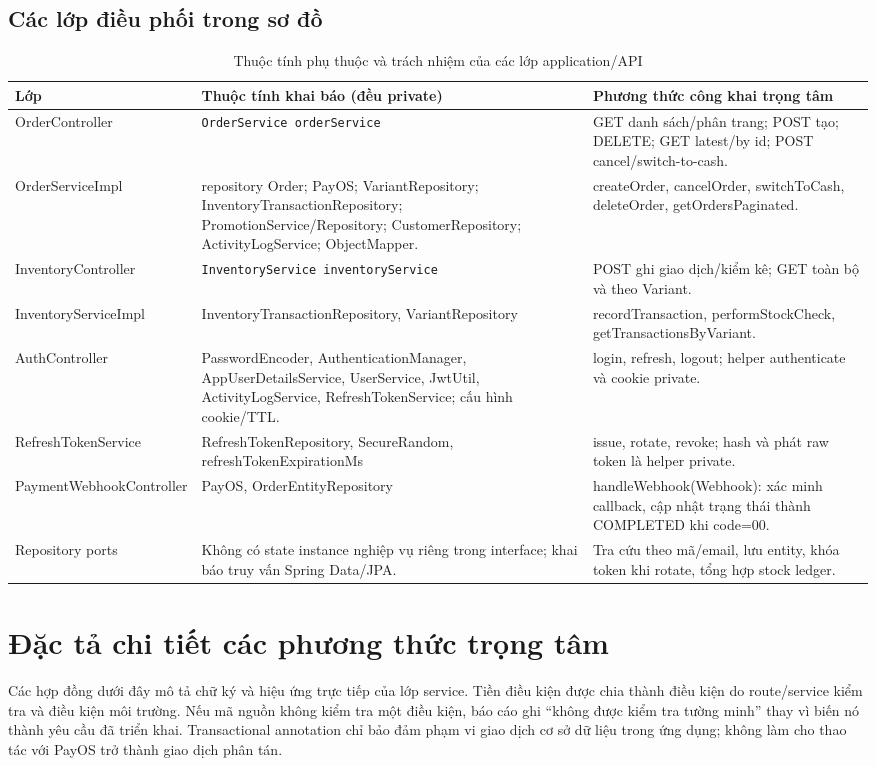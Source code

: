\documentclass[12pt,a4paper,oneside]{report}
\begin{document}
\subsection{Các lớp điều phối trong sơ đồ}
\begin{table}[htbp]
\centering\small
\caption{Thuộc tính phụ thuộc và trách nhiệm của các lớp application/API}
\begin{tabularx}{\textwidth}{@{}p{3.3cm}p{5.8cm}Y@{}}\toprule
Lớp & Thuộc tính khai báo (đều private) & Phương thức công khai trọng tâm\\\midrule
OrderController & \texttt{OrderService orderService} & GET danh sách/phân trang; POST tạo; DELETE; GET latest/by id; POST cancel/switch-to-cash.\\
OrderServiceImpl & repository Order; PayOS; VariantRepository; InventoryTransactionRepository; PromotionService/Repository; CustomerRepository; ActivityLogService; ObjectMapper. & createOrder, cancelOrder, switchToCash, deleteOrder, getOrdersPaginated.\\
InventoryController & \texttt{InventoryService inventoryService} & POST ghi giao dịch/kiểm kê; GET toàn bộ và theo Variant.\\
InventoryServiceImpl & InventoryTransactionRepository, VariantRepository & recordTransaction, performStockCheck, getTransactionsByVariant.\\
AuthController & PasswordEncoder, AuthenticationManager, AppUserDetailsService, UserService, JwtUtil, ActivityLogService, RefreshTokenService; cấu hình cookie/TTL. & login, refresh, logout; helper authenticate và cookie private.\\
RefreshTokenService & RefreshTokenRepository, SecureRandom, refreshTokenExpirationMs & issue, rotate, revoke; hash và phát raw token là helper private.\\
PaymentWebhook\allowbreak Controller & PayOS, OrderEntityRepository & handleWebhook(Webhook): xác minh callback, cập nhật trạng thái thành COMPLETED khi code=00.\\
Repository ports & Không có state instance nghiệp vụ riêng trong interface; khai báo truy vấn Spring Data/JPA. & Tra cứu theo mã/email, lưu entity, khóa token khi rotate, tổng hợp stock ledger.\\
\bottomrule\end{tabularx}
\end{table}
\section{Đặc tả chi tiết các phương thức trọng tâm}
Các hợp đồng dưới đây mô tả chữ ký và hiệu ứng trực tiếp của lớp service. Tiền điều kiện được chia thành điều kiện do route/service kiểm tra và điều kiện môi trường. Nếu mã nguồn không kiểm tra một điều kiện, báo cáo ghi “không được kiểm tra tường minh” thay vì biến nó thành yêu cầu đã triển khai. Transactional annotation chỉ bảo đảm phạm vi giao dịch cơ sở dữ liệu trong ứng dụng; không làm cho thao tác với PayOS trở thành giao dịch phân tán.
\end{document}
